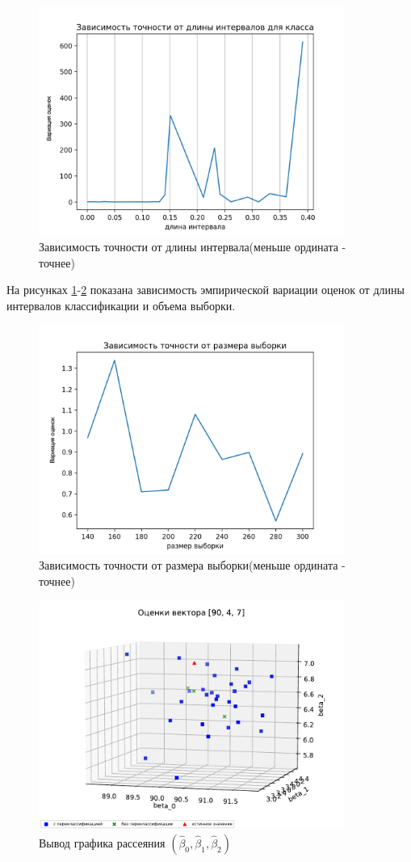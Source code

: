 \documentclass[a4paper,14pt]{extarticle}
\begin{document}
\newpage
\begin{figure}[ht]
    \centering
    \includegraphics[width=100mm]{pics/plot_90_4_accuracy-length.png}
    \caption{Зависимость точности от длины интервала(меньше ордината - точнее)\label{overflow}}
    \label{pic_4}
\end{figure}
На рисунках \ref{pic_4}-\ref{pic_5} показана зависимость эмпирической вариации оценок от длины интервалов классификации и объема выборки.
\begin{figure}[hb]
    \centering
    \includegraphics[width=100mm]{pics/plot_90_4_accuracy-samplesize.png}
    \caption{Зависимость точности от размера выборки(меньше ордината - точнее)\label{overflow}}
    \label{pic_5}
\end{figure}
\newpage
\begin{figure}[h]
    \centering
    \includegraphics[width=100mm]{pics/plot_90_4_7_(4).pdf}
    \caption{Вывод графика рассеяния $(\hat{\beta}_0,\hat{\beta}_1, \hat{\beta}_2)$\label{overflow}}
\end{figure}
\end{document}
